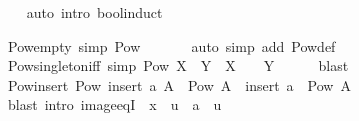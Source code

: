 \begin{isabellebody}
%
\isadelimproof
\ \ %
\endisadelimproof
%
\isatagproof
{}\isamarkupfalse%
\ {\isacharparenleft}{\kern0pt}auto\ intro{\isacharcolon}{\kern0pt}\ bool{\isacharunderscore}{\kern0pt}induct{\isacharparenright}{\kern0pt}%
\endisatagproof
{\isafoldproof}%
%
\isadelimproof
%
\endisadelimproof
%
\begin{isamarkuptext}%
\medskip {}%
\end{isamarkuptext}\isamarkuptrue%
\isamarkupfalse%
\ Pow{\isacharunderscore}{\kern0pt}empty\ {\isacharbrackleft}{\kern0pt}simp{\isacharbrackright}{\kern0pt}{\isacharcolon}{\kern0pt}\ {\isachardoublequoteopen}Pow\ {\isacharbraceleft}{\kern0pt}{\isacharbraceright}{\kern0pt}\ {\isacharequal}{\kern0pt}\ {\isacharbraceleft}{\kern0pt}{\isacharbraceleft}{\kern0pt}{\isacharbraceright}{\kern0pt}{\isacharbraceright}{\kern0pt}{\isachardoublequoteclose}\isanewline
%
\isadelimproof
\ \ %
\endisadelimproof
%
\isatagproof
{}\isamarkupfalse%
\ {\isacharparenleft}{\kern0pt}auto\ simp\ add{\isacharcolon}{\kern0pt}\ Pow{\isacharunderscore}{\kern0pt}def{\isacharparenright}{\kern0pt}%
\endisatagproof
{\isafoldproof}%
%
\isadelimproof
\isanewline
%
\endisadelimproof
\isanewline
{}\isamarkupfalse%
\ Pow{\isacharunderscore}{\kern0pt}singleton{\isacharunderscore}{\kern0pt}iff\ {\isacharbrackleft}{\kern0pt}simp{\isacharbrackright}{\kern0pt}{\isacharcolon}{\kern0pt}\ {\isachardoublequoteopen}Pow\ X\ {\isacharequal}{\kern0pt}\ {\isacharbraceleft}{\kern0pt}Y{\isacharbraceright}{\kern0pt}\ {\isasymlongleftrightarrow}\ X\ {\isacharequal}{\kern0pt}\ {\isacharbraceleft}{\kern0pt}{\isacharbraceright}{\kern0pt}\ {\isasymand}\ Y\ {\isacharequal}{\kern0pt}\ {\isacharbraceleft}{\kern0pt}{\isacharbraceright}{\kern0pt}{\isachardoublequoteclose}\isanewline
%
\isadelimproof
\ \ %
\endisadelimproof
%
\isatagproof
{}\isamarkupfalse%
\ blast%
\endisatagproof
{\isafoldproof}%
%
\isadelimproof
%
\endisadelimproof
\ \ \isanewline
\isanewline
{}\isamarkupfalse%
\ Pow{\isacharunderscore}{\kern0pt}insert{\isacharcolon}{\kern0pt}\ {\isachardoublequoteopen}Pow\ {\isacharparenleft}{\kern0pt}insert\ a\ A{\isacharparenright}{\kern0pt}\ {\isacharequal}{\kern0pt}\ Pow\ A\ {\isasymunion}\ {\isacharparenleft}{\kern0pt}insert\ a\ {\isacharbackquote}{\kern0pt}\ Pow\ A{\isacharparenright}{\kern0pt}{\isachardoublequoteclose}\isanewline
%
\isadelimproof
\ \ %
\endisadelimproof
%
\isatagproof
{}\isamarkupfalse%
\ {\isacharparenleft}{\kern0pt}blast\ intro{\isacharcolon}{\kern0pt}\ image{\isacharunderscore}{\kern0pt}eqI\ {\isacharbrackleft}{\kern0pt}\ {\isacharquery}{\kern0pt}x\ {\isacharequal}{\kern0pt}\ {\isachardoublequoteopen}u\ {\isacharminus}{\kern0pt}\ {\isacharbraceleft}{\kern0pt}a{\isacharbraceright}{\kern0pt}{\isachardoublequoteclose}\ \ u{\isacharbrackright}{\kern0pt}{\isacharparenright}{\kern0pt}%

\end{isabellebody}

